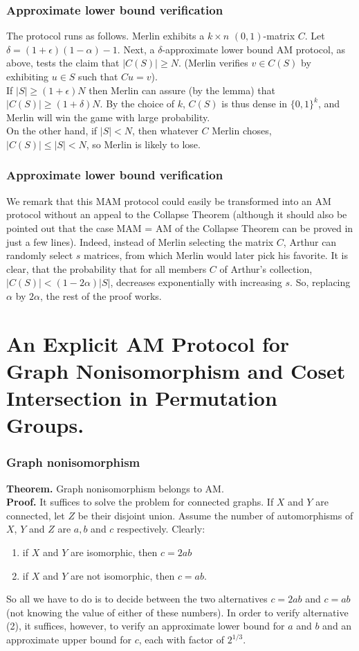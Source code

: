 \documentclass{beamer}
\begin{document}
\begin{frame}
\frametitle{Approximate lower bound verification}
The protocol runs as follows. Merlin exhibits a $k \times n$ $(0,1)$-matrix $C$. Let $\delta = (1 + \epsilon)(1 - \alpha) -1$. Next, a $\delta$-approximate lower bound AM protocol, as above, tests the claim that $|C(S)| \geq N$. (Merlin verifies $v \in C(S)$ by exhibiting $u \in S$ such that $Cu = v$).\\
If $|S| \geq (1 + \epsilon)N$ then Merlin can assure (by the lemma) that $|C(S)| \geq (1 + \delta)N$. By the choice of $k$, $C(S)$ is thus dense in $\{0, 1\}^k$, and Merlin will win the game with large probability.\\
On the other hand, if $|S| < N$, then whatever $C$ Merlin choses, $|C(S)| \leq |S| < N$, so Merlin is likely to lose.
\end{frame}

\begin{frame}
\frametitle{Approximate lower bound verification}
We remark that this MAM protocol could easily be transformed into an AM protocol without an appeal to the Collapse Theorem (although it should also be pointed out that the case MAM = AM of the Collapse Theorem can be proved in just a few lines). Indeed, instead of Merlin selecting the matrix $C$, Arthur can randomly select $s$ matrices, from which Merlin would later pick his favorite. It is clear, that the probability that for all members $C$ of Arthur's collection, $|C(S)| < (1 - 2\alpha)|S|$, decreases exponentially with increasing $s$. So, replacing $\alpha$ by $2\alpha$, the rest of the proof works.
\end{frame}

\section{An Explicit AM Protocol for Graph Nonisomorphism and Coset Intersection in Permutation Groups.}

\begin{frame}
\frametitle{Graph nonisomorphism}
\textbf{Theorem.} Graph nonisomorphism belongs to AM.\\
\textbf{Proof.} It suffices to solve the problem for connected graphs. If $X$ and $Y$ are connected, let $Z$ be their disjoint union. Assume the number of automorphisms of $X$, $Y$ and $Z$ are $a, b$ and $c$ respectively. Clearly: \begin{enumerate}
	\item if $X$ and $Y$ are isomorphic, then $c = 2ab$
	\item if $X$ and $Y$ are not isomorphic, then $c = ab$.
\end{enumerate}
So all we have to do is to decide between the two alternatives $c = 2ab$ and $c = ab$ (not knowing the value of either of these numbers). In order to verify alternative (2), it suffices, however, to verify an approximate lower bound for $a$ and $b$ and an approximate upper bound for $c$, each with factor of $2^{1/3}$.
\end{frame}
\end{document}
